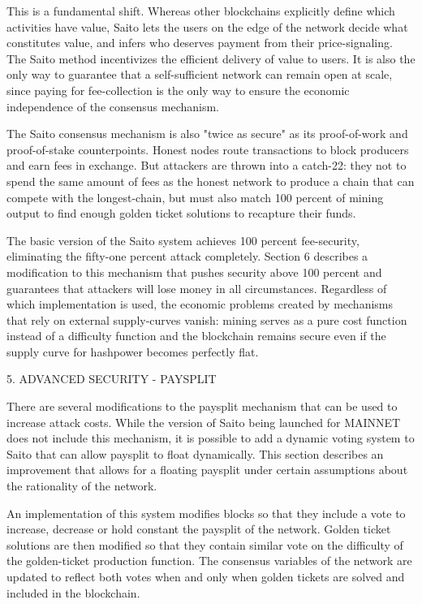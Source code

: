 \documentclass[11pt, oneside]{article}   	%
\begin{document}
\begin{multicols}{2}
This is a fundamental shift. Whereas other blockchains explicitly define which activities have value, Saito lets the users on the edge of the network decide what constitutes value, and infers who deserves payment from their price-signaling. The Saito method incentivizes the efficient delivery of value to users. It is also the only way to guarantee that a self-sufficient network can remain open at scale, since paying for fee-collection is the only way to ensure the economic independence of the consensus mechanism.

The Saito consensus mechanism is also "twice as secure" as its proof-of-work and proof-of-stake counterpoints. Honest nodes route transactions to block producers and earn fees in exchange. But attackers are thrown into a catch-22: they not to spend the same amount of fees as the honest network to produce a chain that can compete with the longest-chain, but must also match 100 percent of mining output to find enough golden ticket solutions to recapture their funds. 

The basic version of the Saito system achieves 100 percent fee-security, eliminating the fifty-one percent attack completely. Section 6 describes a modification to this mechanism that pushes security above 100 percent and guarantees that attackers will lose money in all circumstances. Regardless of which implementation is used, the economic problems created by mechanisms that rely on external supply-curves vanish: mining serves as a pure cost function instead of a difficulty function and the blockchain remains secure even if the supply curve for hashpower becomes perfectly flat.


5. ADVANCED SECURITY - PAYSPLIT

There are several modifications to the paysplit mechanism that can be used to increase attack costs. While the version of Saito being launched for MAINNET does not include this mechanism, it is possible to add a dynamic voting system to Saito that can allow paysplit to float dynamically. This section describes an improvement that allows for a floating paysplit under certain assumptions about the rationality of the network.

An implementation of this system modifies blocks so that they include a vote to increase, decrease or hold constant the paysplit of the network. Golden ticket solutions are then modified so that they contain similar vote on the difficulty of the golden-ticket production function. The consensus variables of the network are updated to reflect both votes when and only when golden tickets are solved and included in the blockchain.


\end{multicols}
\end{document}

